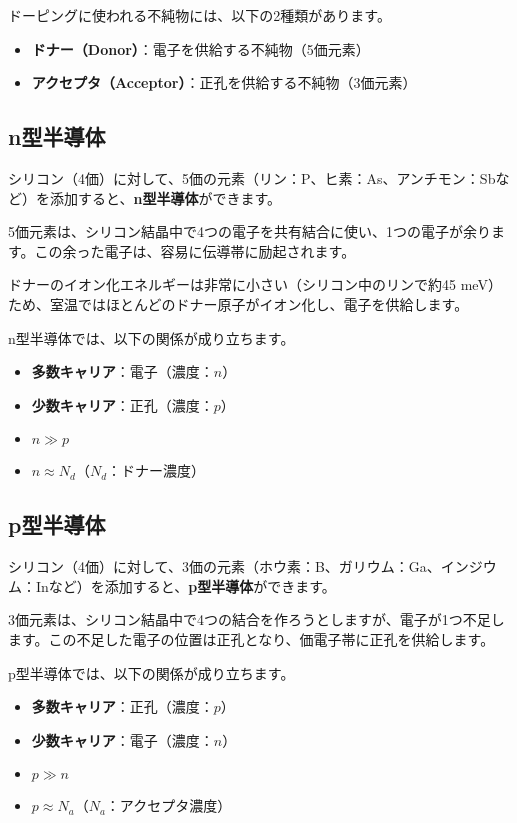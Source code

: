 ドーピングに使われる不純物には、以下の2種類があります。

\begin{itemize}
\item \textbf{ドナー（Donor）}：電子を供給する不純物（5価元素）
\item \textbf{アクセプタ（Acceptor）}：正孔を供給する不純物（3価元素）
\end{itemize}

\subsection{n型半導体}

シリコン（4価）に対して、5価の元素（リン：P、ヒ素：As、アンチモン：Sbなど）を添加すると、\textbf{n型半導体}ができます。

5価元素は、シリコン結晶中で4つの電子を共有結合に使い、1つの電子が余ります。この余った電子は、容易に伝導帯に励起されます。

ドナーのイオン化エネルギーは非常に小さい（シリコン中のリンで約45 meV）ため、室温ではほとんどのドナー原子がイオン化し、電子を供給します。

n型半導体では、以下の関係が成り立ちます。
\begin{itemize}
\item \textbf{多数キャリア}：電子（濃度：$n$）
\item \textbf{少数キャリア}：正孔（濃度：$p$）
\item $n \gg p$
\item $n \approx N_d$（$N_d$：ドナー濃度）
\end{itemize}

\subsection{p型半導体}

シリコン（4価）に対して、3価の元素（ホウ素：B、ガリウム：Ga、インジウム：Inなど）を添加すると、\textbf{p型半導体}ができます。

3価元素は、シリコン結晶中で4つの結合を作ろうとしますが、電子が1つ不足します。この不足した電子の位置は正孔となり、価電子帯に正孔を供給します。

p型半導体では、以下の関係が成り立ちます。
\begin{itemize}
\item \textbf{多数キャリア}：正孔（濃度：$p$）
\item \textbf{少数キャリア}：電子（濃度：$n$）
\item $p \gg n$
\item $p \approx N_a$（$N_a$：アクセプタ濃度）
\end{itemize}

